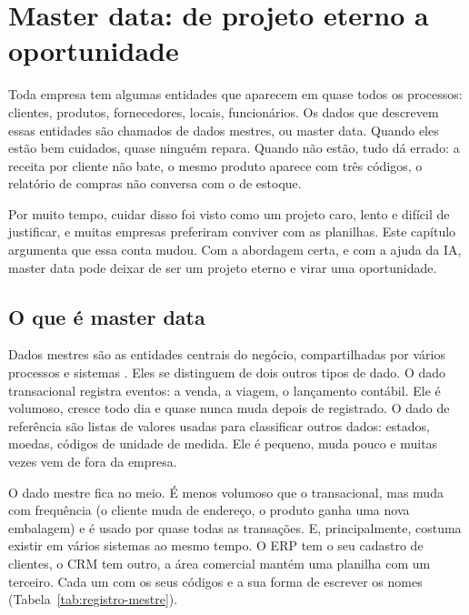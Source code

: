 \chapter{Master data: de projeto eterno a oportunidade}
\label{cap:master-data}

Toda empresa tem algumas entidades que aparecem em quase todos os processos: clientes,
produtos, fornecedores, locais, funcionários. Os dados que descrevem essas entidades são
chamados de dados mestres, ou master data. Quando eles estão bem cuidados, quase ninguém
repara. Quando não estão, tudo dá errado: a receita por cliente não bate, o mesmo produto
aparece com três códigos, o relatório de compras não conversa com o de estoque.

Por muito tempo, cuidar disso foi visto como um projeto caro, lento e difícil de
justificar, e muitas empresas preferiram conviver com as planilhas. Este capítulo
argumenta que essa conta mudou. Com a abordagem certa, e com a ajuda da IA, master data
pode deixar de ser um projeto eterno e virar uma oportunidade.

\section{O que é master data}
\label{sec:o-que-e-master-data}

Dados mestres são as entidades centrais do negócio, compartilhadas por vários processos e
sistemas \parencite{dama2017,loshin2009}. Eles se distinguem de dois outros tipos de dado.
O dado transacional registra eventos: a venda, a viagem, o lançamento contábil. Ele é
volumoso, cresce todo dia e quase nunca muda depois de registrado. O dado de referência
são listas de valores usadas para classificar outros dados: estados, moedas, códigos de
unidade de medida. Ele é pequeno, muda pouco e muitas vezes vem de fora da empresa.

O dado mestre fica no meio. É menos volumoso que o transacional, mas muda com frequência
(o cliente muda de endereço, o produto ganha uma nova embalagem) e é usado por quase todas
as transações. E, principalmente, costuma existir em vários sistemas ao mesmo tempo. O
ERP tem o seu cadastro de clientes, o CRM tem outro, a área comercial mantém uma planilha
com um terceiro. Cada um com os seus códigos e a sua forma de escrever os nomes
(Tabela~\ref{tab:registro-mestre}).

